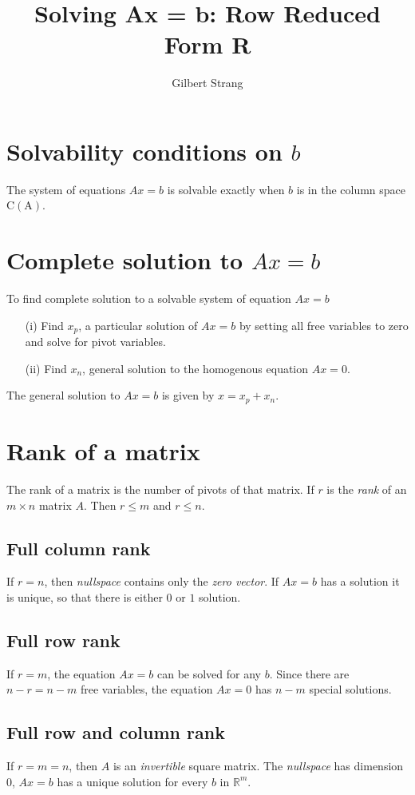 \documentclass{tufte-handout}
\author{Gilbert Strang}
\title{Solving Ax = b: Row Reduced Form R}
\begin{document}
\maketitle

\section{Solvability conditions on $b$}
The system of equations $Ax = b$ is solvable exactly when $b$ is in
the column space $\mathrm{C(A)}$.

\section{Complete solution to $Ax = b$}
To find complete solution to a solvable system of equation $Ax = b$

\begin{itemize}
\item[(i)] Find $x_p$, a particular solution of $Ax = b$ by setting all
free variables to zero and solve for pivot variables.

\item[(ii)] Find $x_n$, general solution to the homogenous equation
$Ax = 0$.
\end{itemize}

The general solution to $Ax = b$ is given by $x = x_p + x_n$.
\section{Rank of a matrix}
The rank of a matrix is the number of pivots of that matrix. If $r$
is the \emph{rank} of an $m \times n$ matrix $A$. Then $r \leq m$ and
$r \leq n$.

\subsection{Full column rank}
If $r = n$, then \emph{nullspace} contains only the \emph{zero vector}.
If $Ax = b$ has a solution it is unique, so that there is either $0$ or
$1$ solution.

\subsection{Full row rank}
If $r = m$, the equation $Ax = b$ can be solved for any $b$. Since there
are $n - r = n - m$ free variables, the equation $Ax = 0$ has $n - m$
special solutions.

\subsection{Full row and column rank}
If $r = m = n$, then $A$ is an \emph{invertible} square matrix. The
\emph{nullspace} has dimension $0$, $Ax = b$ has a unique solution for
every $b$ in $\mathbb{R}^m$.
\end{document}
